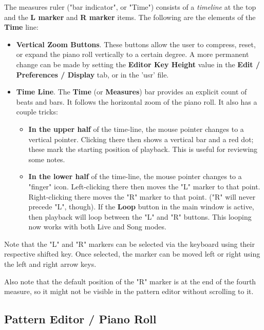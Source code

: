    The measures ruler ("bar indicator", or "Time")
   consists of a \textsl{timeline} at the top and the 
   \textbf{L marker} and \textbf{R marker} items.
   The following are the elements of the \textbf{Time} line:

   \begin{itemize}
      \item \textbf{Vertical Zoom Buttons}.
         These buttons allow the user to compress, reset, or expand the
         piano roll vertically to a certain degree.  A more permanent change
         can be made by setting the \textbf{Editor Key Height} value in
         the \textbf{Edit / Preferences / Display} tab, or in the 'usr' file.
      \item \textbf{Time Line}.
         The \textbf{Time} (or \textbf{Measures}) bar provides an explicit
         count of beats and bars.
         It follows the horizontal zoom of the piano roll.
         It also has a couple tricks:
         \begin{itemize}
            \item \textbf{In the upper half} of the time-line,
               the mouse pointer changes to a vertical pointer.
               Clicking there then shows a vertical bar and a red dot; these mark
               the starting position of playback.
               This is useful for reviewing some notes.
            \item \textbf{In the lower half} of the time-line,
               the mouse pointer changes to a "finger" icon.
               Left-clicking there then moves the "L" marker to that point.
               Right-clicking there moves the "R" marker to that point.
               ("R" will never precede "L", though).
               If the \textbf{Loop} button in the main window is active, then
               playback will loop between the "L" and "R" buttons.
               This looping now works with both Live and Song modes.
         \end{itemize}
   \end{itemize}

   Note that the "L" and "R" markers can be selected via the keyboard using
   their respective shifted key.  Once selected, the marker can be moved left
   or right using the left and right arrow keys.

   Also note that the default position of the "R" marker is at the end of the
   fourth measure, so it might not be visible in the pattern editor without
   scrolling to it.

\subsection{Pattern Editor / Piano Roll}
\label{subsec:pattern_editor_piano_roll}


